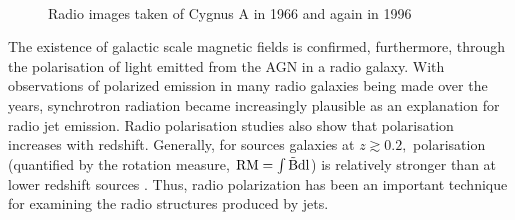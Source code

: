 \documentclass[10pt,a4paper]{article}
\let\vec\vec
\begin{document}
\begin{figure}[!ht]
  \centering
  \\
  \caption[Cygnus A radio imaging in 1966 and 1996]{Radio images taken of Cygnus A in 1966 and again in 1996}
  \label{fig:CygA}
\end{figure}

The existence of galactic scale magnetic fields is confirmed, furthermore, through the polarisation of light emitted from the AGN in a radio galaxy. With observations of polarized emission in many radio galaxies being made over the years, synchrotron radiation became increasingly plausible as an explanation for radio jet emission. Radio polarisation studies also show that polarisation increases with redshift. Generally, for sources galaxies at $z \gtrsim 0.2,$ polarisation (quantified by the rotation measure, $\rm{RM} = \int \vec{B} dl$) is relatively stronger than at lower redshift sources  \citep{Saikia1988,Scarrott1990,Tadhunter1992,Jannuzi1991,diSeregoAlighieri1993,
Tran1995,Jannuzi1995,diSeregoAlighieri1996,Jones1996,Feretti1999,Taylor2002,Kaczmarek2018}. Thus, radio polarization has been an important technique for examining the radio structures produced by jets.
 
\end{document}
